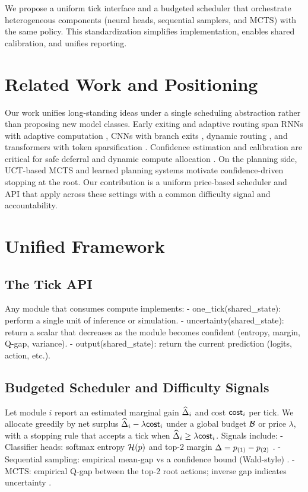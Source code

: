 We propose a uniform tick interface and a budgeted scheduler that orchestrate heterogeneous components (neural heads, sequential samplers, and MCTS) with the same policy. This standardization simplifies implementation, enables shared calibration, and unifies reporting.

\section{Related Work and Positioning}
Our work unifies long-standing ideas under a single scheduling abstraction rather than proposing new model classes. Early exiting and adaptive routing span RNNs with adaptive computation \cite{Graves2016ACT}, CNNs with branch exits \cite{Teerapittayanon2016BranchyNet,Huang2018MSDNet,Bolukbasi2017Adaptive}, dynamic routing \cite{Wang2018SkipNet}, and transformers with token sparsification \cite{Xin2020DeeBERT,Liu2020FastBERT,Elbayad2020DepthAdaptive,Xiao2021DynamicViT,Ryoo2021TokenLearner,Yu2019Slimmable}. Confidence estimation and calibration are critical for safe deferral and dynamic compute allocation \cite{Guo2017Calibration,NiculescuMizil2005Calib,Platt1999,Kendall2017Uncertainty,Gal2016DropoutBayes}. On the planning side, UCT-based MCTS \cite{Kocsis2006UCT,Coulom2006MCTS} and learned planning systems \cite{Silver2017AlphaZero,Schrittwieser2020MuZero} motivate confidence-driven stopping at the root. Our contribution is a uniform price-based scheduler and API that apply across these settings with a common difficulty signal and accountability.

\section{Unified Framework}
\label{sec:framework}
\subsection{The Tick API}
Any module that consumes compute implements:
- one\_tick(shared\_state): perform a single unit of inference or simulation.
- uncertainty(shared\_state): return a scalar that decreases as the module becomes confident (entropy, margin, Q-gap, variance).
- output(shared\_state): return the current prediction (logits, action, etc.).

\subsection{Budgeted Scheduler and Difficulty Signals}
Let module $i$ report an estimated marginal gain $\widehat{\Delta}_i$ and cost $\mathsf{cost}_i$ per tick. We allocate greedily by net surplus $\widehat{\Delta}_i-\lambda\mathsf{cost}_i$ under a global budget $\mathcal{B}$ or price $\lambda$, with a stopping rule that accepts a tick when $\widehat{\Delta}_i \ge \lambda \mathsf{cost}_i$. Signals include:
- Classifier heads: softmax entropy $\mathcal{H}(p)$ and top-2 margin $\Delta = p_{(1)}-p_{(2)}$ \cite{Kaya2019ShallowDeep,Guo2017Calibration}.
- Sequential sampling: empirical mean-gap vs a confidence bound (Wald-style) \cite{Wald1945Sequential,Hoeffding1963}.
- MCTS: empirical Q-gap between the top-2 root actions; inverse gap indicates uncertainty \cite{Kocsis2006UCT,Coulom2006MCTS}.

